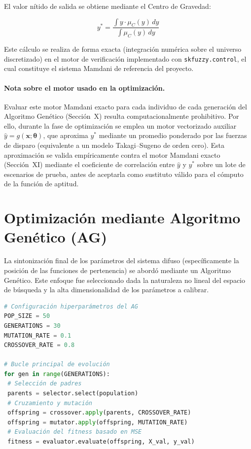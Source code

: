 \documentclass[12pt,a4paper]{article}
\begin{document}
El valor nítido de salida se obtiene mediante el Centro de Gravedad:

\begin{equation}
y^* = \frac{\int y \cdot \mu_C(y)\, dy}{\int \mu_C(y)\, dy}
\end{equation}

Este cálculo se realiza de forma exacta (integración numérica sobre el
universo discretizado) en el motor de verificación implementado con
\texttt{skfuzzy.control}, el cual constituye el sistema Mamdani de
referencia del proyecto.

\paragraph{Nota sobre el motor usado en la optimización.}
Evaluar este motor Mamdani exacto para cada individuo de cada generación
del Algoritmo Genético (Sección~X) resulta computacionalmente prohibitivo.
Por ello, durante la fase de optimización se emplea un motor vectorizado
auxiliar $\hat{y} = g(\mathbf{x}; \boldsymbol{\theta})$, que aproxima
$y^*$ mediante un promedio ponderado por las fuerzas de disparo
(equivalente a un modelo Takagi--Sugeno de orden cero). Esta aproximación
se valida empíricamente contra el motor Mamdani exacto (Sección~XI)
mediante el coeficiente de correlación entre $\hat{y}$ y $y^*$ sobre un
lote de escenarios de prueba, antes de aceptarla como sustituto válido
para el cómputo de la función de aptitud.


\section{Optimización mediante Algoritmo Genético (AG)}


\vspace{0.5cm}
La sintonización final de los parámetros del sistema difuso (específicamente la posición de las funciones de pertenencia) se abordó mediante un Algoritmo Genético. Este enfoque fue seleccionado dada la naturaleza no lineal del espacio de búsqueda y la alta dimensionalidad de los parámetros a calibrar.

\begin{lstlisting}[language=Python, caption={Configuración del Algoritmo Genético (\texttt{Optimizacion\_Algoritmo\_Genetico.ipynb})}, label={lst:ag_setup}]
# Configuración hiperparámetros del AG
POP_SIZE = 50
GENERATIONS = 30
MUTATION_RATE = 0.1
CROSSOVER_RATE = 0.8

# Bucle principal de evolución
for gen in range(GENERATIONS):
 # Selección de padres
 parents = selector.select(population)
 # Cruzamiento y mutación
 offspring = crossover.apply(parents, CROSSOVER_RATE)
 offspring = mutator.apply(offspring, MUTATION_RATE)
 # Evaluación del fitness basado en MSE
 fitness = evaluator.evaluate(offspring, X_val, y_val)
\end{lstlisting}
\end{document}
